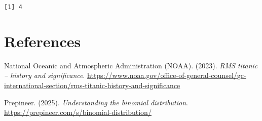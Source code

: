 \documentclass[
  letterpaper,
  DIV=11,
  numbers=noendperiod]{scrartcl}
\newlength{\cslhangindent}
\newenvironment{CSLReferences}[2] %
 {\begin{list}{}{%
  \setlength{\itemindent}{0pt}
  \setlength{\leftmargin}{0pt}
  \setlength{\parsep}{0pt}
  \ifodd #1
   \setlength{\leftmargin}{\cslhangindent}
   \setlength{\itemindent}{-1\cslhangindent}
  \fi
  \setlength{\itemsep}{#2\baselineskip}}}
 {\end{list}}
\begin{document}
\begin{verbatim}
[1] 4
\end{verbatim}

\section*{References}\label{references}

\label{refs}
\begin{CSLReferences}{1}{0}
National Oceanic and Atmospheric Administration (NOAA). (2023).
\emph{RMS titanic -- history and significance}.
\url{https://www.noaa.gov/office-of-general-counsel/gc-international-section/rms-titanic-history-and-significance}

Prepineer. (2025). \emph{Understanding the binomial distribution}.
\url{https://prepineer.com/s/binomial-distribution/}

\end{CSLReferences}
\end{document}
